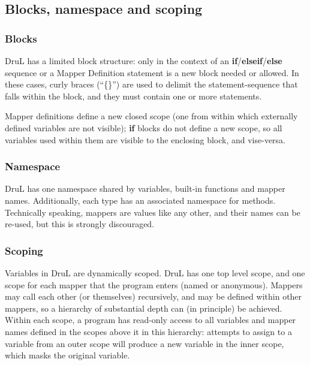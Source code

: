 \subsection{Blocks, namespace and scoping}

\subsubsection{Blocks}

DruL has a limited block structure: only in the context of an \textbf{if}/\textbf{elseif}/\textbf{else} sequence or a Mapper Definition statement is a new block needed or allowed.  In these cases, curly braces (``\{\}'') are used to delimit the statement-sequence that falls within the block, and they must contain one or more statements.

Mapper definitions define a new closed scope (one from within which externally defined variables are not visible); \textbf{if} blocks do not define a new scope, so all variables used within them are visible to the enclosing  block, and vise-versa.

\subsubsection{Namespace}

DruL has one namespace shared by variables, built-in functions and 
mapper names. Additionally, each type has an associated namespace for methods.  Technically speaking, mappers are values like any other, and their names can be re-used, but this is strongly discouraged.

\subsubsection{Scoping}

Variables in DruL are dynamically scoped.  
DruL has one top level scope, and one scope for each mapper that the program enters
(named or anonymous). Mappers may call each other (or themselves) recursively, and may be defined within other mappers, so a hierarchy of substantial depth can (in principle) be achieved.
Within each scope, a program has read-only access to all variables and mapper names
defined in the scopes above it in this hierarchy: attempts to assign to a variable from an outer scope
will produce a new variable in the inner scope, which masks the original variable.






